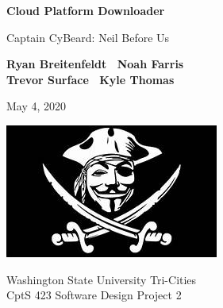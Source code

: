 \documentclass{article}
\begin{document}

    \begin{titlepage}
        \begin{center}
            \vspace*{1cm}
    
            \Huge
            \textbf{Cloud Platform Downloader}
    
            \vspace{.5cm}
            \LARGE
            Captain CyBeard: Neil Before Us
    
            \vspace{1cm}
    
            \textbf{Ryan Breitenfeldt \textbar\ Noah Farris\\ Trevor Surface \textbar\ Kyle Thomas}
    
            \vspace{.2cm}
            \Large
            May 4, 2020
    
            \vspace{2cm}
            \includegraphics[scale=1]{logo}
    
            \vfill
    
            Washington State University Tri-Cities\\
            CptS 423 Software Design Project 2
    
        \end{center}
    \end{titlepage}
\end{document}
